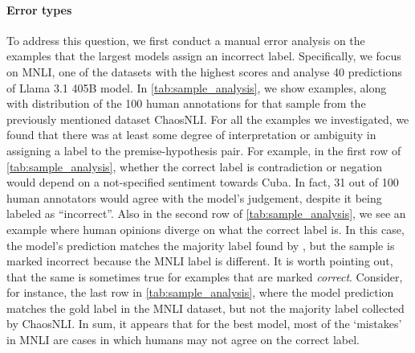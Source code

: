 \paragraph{Error types} To address this question, we first conduct a manual error analysis on the examples that the largest models assign an incorrect label.
Specifically, we focus on MNLI, one of the datasets with the highest scores and analyse 40 predictions of Llama 3.1 405B model.
In \cref{tab:sample_analysis}, we show examples, along with distribution of the 100 human annotations for that sample from the previously mentioned dataset ChaosNLI.
For all the examples we investigated, we found that there was at least some degree of interpretation or ambiguity in assigning a label to the premise-hypothesis pair.
For example, in the first row of \cref{tab:sample_analysis}, whether the correct label is contradiction or negation would depend on a not-specified sentiment towards Cuba.
In fact, 31 out of 100 human annotators would agree with the model's judgement, despite it being labeled as ``incorrect''.
Also in the second row of \cref{tab:sample_analysis}, we see an example where human opinions diverge on what the correct label is.
In this case, the model's prediction matches the majority label found by \citet{nie-etal-2020-learn}, but the sample is marked incorrect because the MNLI label is different.
It is worth pointing out, that the same is sometimes true for examples that are marked \emph{correct}.
Consider, for instance, the last row in \cref{tab:sample_analysis}, where the model prediction matches the gold label in the MNLI dataset, but not the majority label collected by ChaosNLI.
In sum, it appears that for the best model, most of the `mistakes' in MNLI are cases in which humans may not agree on the correct label.

